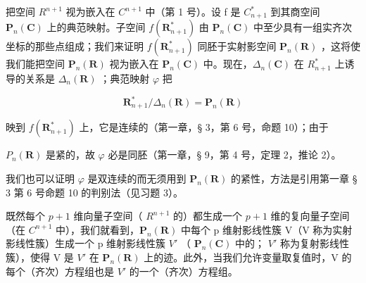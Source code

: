 把空间 \(R^{n+1}\) 视为嵌入在 \(C^{n+1}\) 中（第 1 号）。设 f 是 \(C_{n+1}^{*}\) 到其商空间 \(\mathbf{P}_{n}(\mathbf{C})\) 上的典范映射。子空间 \(f(\mathbf{R}_{n+1}^{*})\) 由 \(\mathbf{P}_{n}(\mathbf{C})\) 中至少具有一组实齐次坐标的那些点组成；我们来证明 \(f(\mathbf{R}_{n+1}^{*})\) 同胚于实射影空间 \(\mathbf{P}_{n}(\mathbf{R})\) ，这将使我们能把空间 \(\mathbf{P}_{n}(\mathbf{R})\) 视为嵌入在 \(\mathbf{P}_{n}(\mathbf{C})\) 中。现在，\(\Delta_{n}(\mathbf{C})\) 在 \(R_{n+1}^{*}\) 上诱导的关系是 \(\Delta_{n}(\mathbf{R})\) ；典范映射 \(\varphi\) 把

\[
\mathbf {R} _ {n + 1} ^ {*} / \Delta_ {n} (\mathbf {R}) = \mathbf {P} _ {n} (\mathbf {R})
\]

映到 \(f(\mathbf{R}_{n+1}^*)\) 上，它是连续的（第一章，§ 3，第 6 号，命题 10）；由于

\(P_{n}(\mathbf{R})\) 是紧的，故 \(\varphi\) 必是同胚（第一章，§ 9，第 4 号，定理 2，推论 2）。

我们也可以证明 \(\varphi\) 是双连续的而无须用到 \(\mathbf{P}_n(\mathbf{R})\) 的紧性，方法是引用第一章 § 3 第 6 号命题 10 的判别法（见习题 3）。

既然每个 \(p + 1\) 维向量子空间（ \(R^{n+1}\) 的）都生成一个 \(p + 1\) 维的复向量子空间（在 \(C^{n+1}\) 中），我们就看到，\(\mathbf{P}_{n}(\mathbf{R})\) 中每个 p 维射影线性簇 V（V 称为实射影线性簇）生成一个 p 维射影线性簇 \(V'\) （ \(\mathbf{P}_{n}(\mathbf{C})\) 中的； \(V'\) 称为复射影线性簇），使得 V 是 \(V'\) 在 \(\mathbf{P}_{n}(\mathbf{R})\) 上的迹。此外，当我们允许变量取复值时，V 的每个（齐次）方程组也是 \(V'\) 的一个（齐次）方程组。

